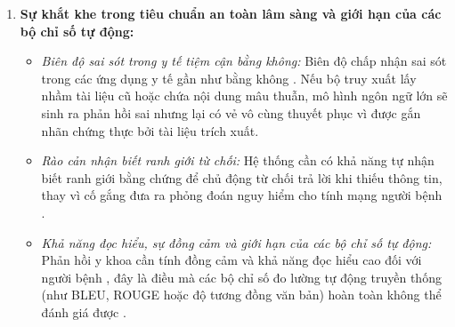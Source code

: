 \begin{enumerate}[label=(\arabic*)]
    \item \textbf{Sự khắt khe trong tiêu chuẩn an toàn lâm sàng và giới hạn của các bộ chỉ số tự động:}
    \begin{itemize}
        \item \textit{Biên độ sai sót trong y tế tiệm cận bằng không:} Biên độ chấp nhận sai sót trong các ứng dụng y tế gần như bằng không \cite{who2022musculoskeletal, medtrustrag}. Nếu bộ truy xuất lấy nhầm tài liệu cũ hoặc chứa nội dung mâu thuẫn, mô hình ngôn ngữ lớn sẽ sinh ra phản hồi sai nhưng lại có vẻ vô cùng thuyết phục vì được gắn nhãn chứng thực bởi tài liệu trích xuất.
        \item \textit{Rào cản nhận biết ranh giới từ chối:} Hệ thống cần có khả năng tự nhận biết ranh giới bằng chứng để chủ động từ chối trả lời khi thiếu thông tin, thay vì cố gắng đưa ra phỏng đoán nguy hiểm cho tính mạng người bệnh \cite{medtrustrag}.
        \item \textit{Khả năng đọc hiểu, sự đồng cảm và giới hạn của các bộ chỉ số tự động:} Phản hồi y khoa cần tính đồng cảm và khả năng đọc hiểu cao đối với người bệnh \cite{ortho_rag_13}, đây là điều mà các bộ chỉ số đo lường tự động truyền thống (như BLEU, ROUGE hoặc độ tương đồng văn bản) hoàn toàn không thể đánh giá được \cite{ragas2023, medtrustrag}.
    \end{itemize}
\end{enumerate}
